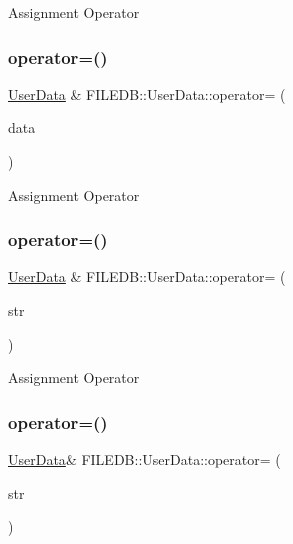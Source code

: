 Assignment Operator \mbox{\label{classFILEDB_1_1UserData_a76e926353b2019d6b5a6333d3cc4c5b4}} 
\subsubsection{\texorpdfstring{operator=()}{operator=()}\hspace{0.1cm}{\footnotesize\ttfamily [3/6]}}
{\footnotesize\ttfamily \mbox{\hyperlink{classFILEDB_1_1UserData}{User\+Data}} \& F\+I\+L\+E\+D\+B\+::\+User\+Data\+::operator= (\begin{DoxyParamCaption}\item[{const \mbox{\hyperlink{classFILEDB_1_1UserData}{User\+Data}} \&}]{data }\end{DoxyParamCaption})}

Assignment Operator \mbox{\label{classFILEDB_1_1UserData_ad8582ecfcd84204c1fa83d050cd2d8bd}} 
\subsubsection{\texorpdfstring{operator=()}{operator=()}\hspace{0.1cm}{\footnotesize\ttfamily [4/6]}}
{\footnotesize\ttfamily \mbox{\hyperlink{classFILEDB_1_1UserData}{User\+Data}} \& F\+I\+L\+E\+D\+B\+::\+User\+Data\+::operator= (\begin{DoxyParamCaption}\item[{const std\+::string \&}]{str }\end{DoxyParamCaption})}

Assignment Operator \mbox{\label{classFILEDB_1_1UserData_ab41f011c29fc6e394dbb1b960c7947b0}} 
\subsubsection{\texorpdfstring{operator=()}{operator=()}\hspace{0.1cm}{\footnotesize\ttfamily [5/6]}}
{\footnotesize\ttfamily \mbox{\hyperlink{classFILEDB_1_1UserData}{User\+Data}}\& F\+I\+L\+E\+D\+B\+::\+User\+Data\+::operator= (\begin{DoxyParamCaption}\item[{const std\+::string \&}]{str }\end{DoxyParamCaption})}

